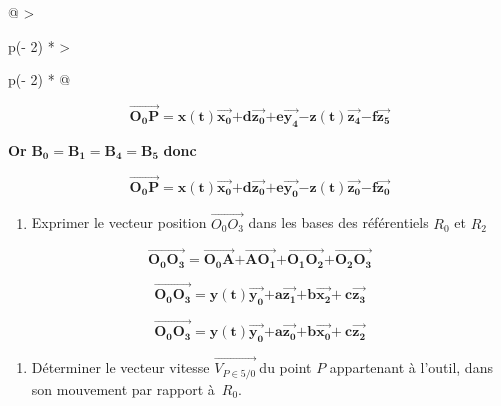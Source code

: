 \begin{longtable}{@{}
  >{\raggedright\arraybackslash}p{(\columnwidth - 2\tabcolsep) * }
  >{\raggedright\arraybackslash}p{(\columnwidth - 2\tabcolsep) * }@{}}
\begin{minipage}[b]{\linewidth}
\[\overrightarrow{\mathbf{O}_{\mathbf{0}}\mathbf{P}}\mathbf{=}\mathbf{x}\left( \mathbf{t} \right)\overrightarrow{\mathbf{x}_{\mathbf{0}}}\mathbf{+ d}\overrightarrow{\mathbf{z}_{\mathbf{0}}}\mathbf{+}\mathbf{e}\overrightarrow{\mathbf{y}_{\mathbf{4}}}\mathbf{- z}\left( \mathbf{t} \right)\overrightarrow{\mathbf{z}_{\mathbf{4}}}\mathbf{- f}\overrightarrow{\mathbf{z}_{\mathbf{5}}}\]

\textbf{Or}
\(\mathbf{B}_{\mathbf{0}}\mathbf{=}\mathbf{B}_{\mathbf{1}}\mathbf{=}\mathbf{}\mathbf{B}_{\mathbf{4}}\mathbf{=}\mathbf{B}_{\mathbf{5}}\)
\textbf{donc}

\[\overrightarrow{\mathbf{O}_{\mathbf{0}}\mathbf{P}}\mathbf{=}\mathbf{x}\left( \mathbf{t} \right)\overrightarrow{\mathbf{x}_{\mathbf{0}}}\mathbf{+ d}\overrightarrow{\mathbf{z}_{\mathbf{0}}}\mathbf{+}\mathbf{e}\overrightarrow{\mathbf{y}_{\mathbf{0}}}\mathbf{- z}\left( \mathbf{t} \right)\overrightarrow{\mathbf{z}_{\mathbf{0}}}\mathbf{- f}\overrightarrow{\mathbf{z}_{\mathbf{0}}}\]

\begin{enumerate}
\def\labelenumi{\arabic{enumi}.}
\setcounter{enumi}{1}
\item
  Exprimer le vecteur position \(\overrightarrow{O_{0}O_{3}}\) dans les
  bases des référentiels \(R_{0}\) et \(R_{2}\)
\end{enumerate}

\[\overrightarrow{\mathbf{O}_{\mathbf{0}}\mathbf{O}_{\mathbf{3}}}\mathbf{=}\overrightarrow{\mathbf{O}_{\mathbf{0}}\mathbf{A}}\mathbf{+}\overrightarrow{{\mathbf{A}\mathbf{O}}_{\mathbf{1}}}\mathbf{+}\overrightarrow{\mathbf{O}_{\mathbf{1}}\mathbf{O}_{\mathbf{2}}}\mathbf{+}\overrightarrow{\mathbf{O}_{\mathbf{2}}\mathbf{O}_{\mathbf{3}}}\]

\[\overrightarrow{\mathbf{O}_{\mathbf{0}}\mathbf{O}_{\mathbf{3}}}\mathbf{=}\mathbf{y}\left( \mathbf{t} \right)\overrightarrow{\mathbf{y}_{\mathbf{0}}}\mathbf{+}\mathbf{a}\overrightarrow{\mathbf{z}_{\mathbf{1}}}\mathbf{+}\mathbf{b}\overrightarrow{\mathbf{x}_{\mathbf{2}}}\mathbf{+}\mathbf{\ }\mathbf{c}\overrightarrow{\mathbf{z}_{\mathbf{3}}}\]

\[\overrightarrow{\mathbf{O}_{\mathbf{0}}\mathbf{O}_{\mathbf{3}}}\mathbf{=}\mathbf{y}\left( \mathbf{t} \right)\overrightarrow{\mathbf{y}_{\mathbf{0}}}\mathbf{+}\mathbf{a}\overrightarrow{\mathbf{z}_{\mathbf{0}}}\mathbf{+}\mathbf{b}\overrightarrow{\mathbf{x}_{\mathbf{0}}}\mathbf{+}\mathbf{\ }\mathbf{c}\overrightarrow{\mathbf{z}_{\mathbf{2}}}\]

\begin{enumerate}
\def\labelenumi{\arabic{enumi}.}
\setcounter{enumi}{2}
\item
  Déterminer le vecteur vitesse \(\overrightarrow{V_{P \in 5/0}}\ \)du
  point \(P\) appartenant à l'outil, dans son mouvement par rapport
  à~\(R_{0}\).
\end{enumerate}


\end{minipage}
\end{longtable}

